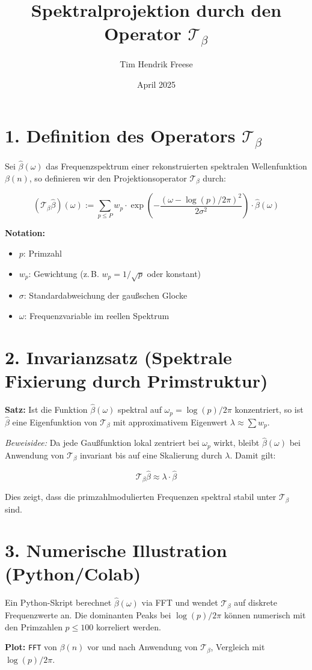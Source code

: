 \documentclass[12pt]{article}
\title{Spektralprojektion durch den Operator \(\mathcal{T}_\beta\)}
\author{Tim Hendrik Freese}
\date{April 2025}
\begin{document}
\maketitle

\section*{1. Definition des Operators \(\mathcal{T}_\beta\)}

Sei \(\hat{\beta}(\omega)\) das Frequenzspektrum einer rekonstruierten spektralen Wellenfunktion \(\beta(n)\), so definieren wir den Projektionsoperator \(\mathcal{T}_\beta\) durch:

\begin{equation}
(\mathcal{T}_\beta \hat{\beta})(\omega) := \sum_{p \leq P} w_p \cdot \exp\left( -\frac{(\omega - \log(p)/2\pi)^2}{2\sigma^2} \right) \cdot \hat{\beta}(\omega)
\end{equation}

\textbf{Notation:}
\begin{itemize}
    \item \(p\): Primzahl
    \item \(w_p\): Gewichtung (z.\,B. \(w_p = 1/\sqrt{p}\) oder konstant)
    \item \(\sigma\): Standardabweichung der gaußschen Glocke
    \item \(\omega\): Frequenzvariable im reellen Spektrum
\end{itemize}

\section*{2. Invarianzsatz (Spektrale Fixierung durch Primstruktur)}

\textbf{Satz:}  
Ist die Funktion \(\hat{\beta}(\omega)\) spektral auf \(\omega_p = \log(p)/2\pi\) konzentriert, so ist \(\hat{\beta}\) eine Eigenfunktion von \(\mathcal{T}_\beta\) mit approximativem Eigenwert \(\lambda \approx \sum w_p\).

\textit{Beweisidee:}  
Da jede Gaußfunktion lokal zentriert bei \(\omega_p\) wirkt, bleibt \(\hat{\beta}(\omega)\) bei Anwendung von \(\mathcal{T}_\beta\) invariant bis auf eine Skalierung durch \(\lambda\). Damit gilt:

\[
\mathcal{T}_\beta \hat{\beta} \approx \lambda \cdot \hat{\beta}
\]

Dies zeigt, dass die primzahlmodulierten Frequenzen spektral stabil unter \(\mathcal{T}_\beta\) sind.

\section*{3. Numerische Illustration (Python/Colab)}

Ein Python-Skript berechnet \(\hat{\beta}(\omega)\) via FFT und wendet \(\mathcal{T}_\beta\) auf diskrete Frequenzwerte an. Die dominanten Peaks bei \(\log(p)/2\pi\) können numerisch mit den Primzahlen \(p \leq 100\) korreliert werden.

\textbf{Plot:} \texttt{FFT} von \(\beta(n)\) vor und nach Anwendung von \(\mathcal{T}_\beta\), Vergleich mit \(\log(p)/2\pi\).
\end{document}
